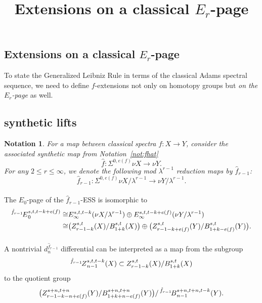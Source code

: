 \documentclass[12pt,a4paper]{article}
\title{Extensions on a classical $E_r$-page}
\author{}
\newtheorem{notation}[equation]{Notation}
\newcommand{\ESS}[1]{\prescript{#1\!}{}{E}}
\newcommand{\ZESS}[1]{\prescript{#1\!}{}{Z}}
\newcommand{\BESS}[1]{\prescript{#1\!}{}{B}}
\newcommand{\Sus}{\Sigma}
\newcommand{\iso}{\cong}
\begin{document}
\sffamily
\maketitle
\thispagestyle{empty}

\huge

\begin{sloppy}

\section{Extensions on a classical $E_r$-page} \label{sec:extenpage}

To state the Generalized Leibniz Rule in terms of the classical Adams spectral sequence, we need to define $f$-extensions not only on homotopy groups but \emph{on the $E_r$-page} as well.

\subsection{synthetic lifts}

\begin{notation}
For a map between classical spectra $f: X\to Y$, consider the associated synthetic map from Notation~\ref{not:fhat}
$$\hat f: \Sus^{0,e(f)}\nu X\to \nu Y.$$
For any $2\le r\le \infty$, we denote the following mod $\lambda^{r-1}$ reduction maps by $\hat f_{r-1}$:
$$\hat f_{r-1}: \Sus^{0,e(f)}\nu X/\lambda^{r-1}\to \nu Y/\lambda^{r-1}.$$
\end{notation}

\paragraph{}

The $E_0$-page of the $\hat f_{r-1}$-ESS is isomorphic to
$$\begin{aligned}
    \ESS{\hat f_{r-1}}_0^{s,t,t-k+e(f)}\iso & E_\infty^{s,t,t-k}(\nu X/\lambda^{r-1})\oplus E_\infty^{s,t,t-k+e(f)}(\nu Y/\lambda^{r-1})\\
    \iso & \big(Z_{r-1-k}^{s,t}(X)/B_{1+k}^{s,t}(X)\big)\oplus \big(Z_{r-1-k+e(f)}^{s,t}(Y)/B_{1+k-e(f)}^{s,t}(Y)\big).
\end{aligned}$$

\paragraph{}
A nontrivial $d^{\hat f_{r-1}}_n$ differential can be interpreted as a map from the subgroup
\begin{equation}\label{eq:eae450fe}
  \ZESS{\hat f_{r-1}}_{n-1}^{s,t,t-k}(X) \subset  Z_{r-1-k}^{s,t}(X)/B_{1+k}^{s,t}(X)
\end{equation}
to the quotient group
\begin{equation}\label{eq:334248d2}
    \big(Z_{r-1-k-n+e(f)}^{s+n,t+n}(Y)/B_{1+k+n-e(f)}^{s+n,t+n}(Y) \big)/\BESS{\hat f_{r-1}}_{n-1}^{s+n,t+n,t-k}(Y).
\end{equation}


\end{sloppy}
\end{document}

